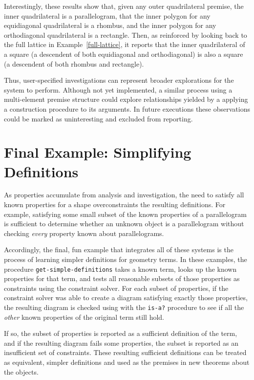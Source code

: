 Interestingly, these results show that, given any outer quadrilateral
premise, the inner quadrilateral is a parallelogram, that the inner
polygon for any equidiagonal quadrilateral is a rhombus, and the inner
polygon for any orthodiagonal quadrilateral is a rectangle. Then, as
reinforced by looking back to the full lattice in
Example~\ref{full-lattice}, it reports that the inner quadrilateral of
a square (a descendent of both equidiagonal and orthodiagonal) is also a
square (a descendent of both rhombus and rectangle).


Thus, user-specified investigations can represent broader explorations
for the system to perform.  Although not yet implemented, a similar
process using a multi-element premise structure could explore
relationships yielded by a applying a construction procedure to its
arguments. In future executions these observations could be marked as
uninteresting and excluded from reporting.

\section{Final Example: Simplifying Definitions}
\label{sec:end-goal-2}

As properties accumulate from analysis and investigation, the need to
satisfy all known properties for a shape overconstraints the resulting
definitions. For example, satisfying some small subset of the known
properties of a parallelogram is sufficient to determine whether an
unknown object is a parallelogram without checking \emph{every}
property known about parallelograms.

Accordingly, the final, fun example that integrates all of these
systems is the process of learning simpler definitions for geometry
terms. In these examples, the procedure
\texttt{get-simple-definitions} takes a known term, looks up the known
properties for that term, and tests all reasonable subsets of those
properties as constraints using the constraint solver. For each subset
of properties, if the constraint solver was able to create a diagram
satisfying exactly those properties, the resulting diagram is checked
using with the \texttt{is-a?} procedure to see if all the \emph{other}
known properties of the original term still hold.

If so, the subset of properties is reported as a sufficient definition
of the term, and if the resulting diagram fails some properties, the
subset is reported as an insufficient set of constraints. These
resulting sufficient definitions can be treated as equivalent, simpler
definitions and used as the premises in new theorems about the
objects.

